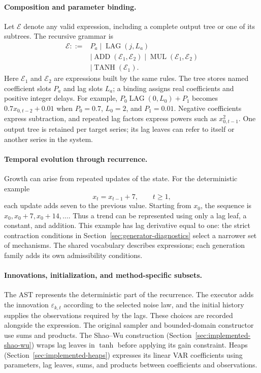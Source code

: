 \paragraph{Composition and parameter binding.}
Let $\mathcal E$ denote any valid expression, including a complete output
tree or one of its subtrees. The recursive grammar is
\begin{equation}
\begin{aligned}
\mathcal E ::= {}& P_a \mid \operatorname{LAG}(j,L_a)\\
 &\mid\operatorname{ADD}(\mathcal E_1,\mathcal E_2)
  \mid\operatorname{MUL}(\mathcal E_1,\mathcal E_2)\\
 &\mid\operatorname{TANH}(\mathcal E_1).
\end{aligned}
\label{eq:generator-vocabulary-grammar}
\end{equation}
Here $\mathcal E_1$ and $\mathcal E_2$ are expressions built by the same rules.
The tree stores named coefficient slots $P_a$ and lag slots $L_a$; a binding
assigns real coefficients and positive integer delays. For example,
$P_0\operatorname{LAG}(0,L_0)+P_1$ becomes
$0.7x_{0,t-2}+0.01$ when $P_0=0.7$, $L_0=2$, and $P_1=0.01$.
Negative coefficients express subtraction, and repeated lag factors express
powers such as $x_{0,t-1}^2$. One output tree is retained per target series;
its lag leaves can refer to itself or another series in the system.

\paragraph{Temporal evolution through recurrence.}
Growth can arise from repeated updates of the state. For the deterministic
example
\begin{equation}
 x_t=x_{t-1}+7,\qquad t\geq1,
 \label{eq:generator-recurrent-trend}
\end{equation}
each update adds seven to the previous value. Starting from $x_0$, the
sequence is $x_0,x_0+7,x_0+14,\ldots$. Thus a trend can be represented using
only a lag leaf, a constant, and addition. This example has lag derivative
equal to one: the strict contraction conditions in
Section~\ref{sec:generator-diagnostics} select a narrower set of mechanisms.
The shared vocabulary describes expressions; each generation family adds
its own admissibility conditions.

\paragraph{Innovations, initialization, and method-specific subsets.}
The AST represents the deterministic part of the recurrence. The executor
adds the innovation $\varepsilon_{k,t}$ according to the selected noise law,
and the initial history supplies the observations required by the lags.
These choices are recorded alongside the expression. The original sampler
and bounded-domain constructor use sums and products. The Shao--Wu
construction (Section~\ref{sec:implemented-shao-wu}) wraps lag leaves in
$\tanh$ before applying its gain constraint. Heaps
(Section~\ref{sec:implemented-heaps}) expresses its linear VAR coefficients
using parameters, lag leaves, sums, and products between coefficients and
observations.

